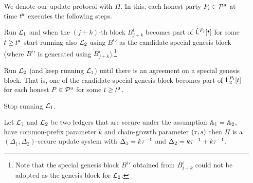 We denote our update protocol with $\Pi$. In this, each honest party $P_i\in\mathcal{P}^\mathsf{u}$ at time $t^{\mathsf{u}}$ executes the following steps.

\begin{myenumerate}
	\item Run $\mathcal{L}_1$ and when the $(j+k)$-th block $B^i_{j+k}$ becomes part of $\check {\mathsf{L}}^{P_i}[t]$ for some $t\geq t^{\mathsf{u}}$
	start running also $\mathcal{L}_2$ using ${B^i}'$ as the candidate special genesis block (where ${B^i}'$ is generated using $B^i_{j+k}$).\footnote{Note that
	the special genesis block ${B^i}'$ obtained from $B^i_{j+k}$ could not be adopted as the genesis block for $\mathcal{L}_2$.}
	\item Run $\mathcal{L}_2$ (and keep running $\mathcal{L}_1$) until there is an agreement on a special genesis block. That is, one of the candidate special genesis block 
	becomes part of $\mathsf{L}_2^{P_i}[t]$ for each honest $P\in\mathcal{P}^\mathsf{u}$ for some $t\geq t^{\mathsf{u}}$.
	\item Stop running $\mathcal{L}_1$.
\end{myenumerate}



\begin{theorem}\label{th:main}
Let $\mathcal{L}_1$ and $\mathcal{L}_2$ be two ledgers that are secure under the assumption $\mathbb{A}_1=\mathbb{A}_2$, have common-prefix parameter $k$ and chain-growth parameter $(\tau, s)$ then
 $\Pi$ is a $(\Delta_1,\Delta_2)$-secure update system with $\Delta_1=k\tau^{-1}$ and $\Delta_2=k \tau^{-1} + k \tau^{-1}$.
\end{theorem}

